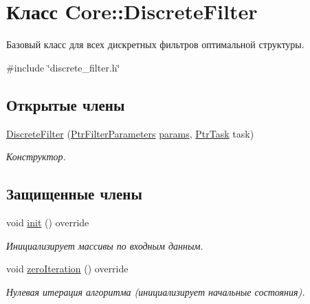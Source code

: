 \hypertarget{class_core_1_1_discrete_filter}{}\section{Класс Core\+:\+:Discrete\+Filter}
\label{class_core_1_1_discrete_filter}


Базовый класс для всех дискретных фильтров оптимальной структуры.  




{\ttfamily \#include \char`\"{}discrete\+\_\+filter.\+h\char`\"{}}

\subsection*{Открытые члены}
\begin{DoxyCompactItemize}
\item 
\hypertarget{class_core_1_1_discrete_filter_a87399ba405c2dfe8037191fe907df141}{}\label{class_core_1_1_discrete_filter_a87399ba405c2dfe8037191fe907df141} 
\hyperlink{class_core_1_1_discrete_filter_a87399ba405c2dfe8037191fe907df141}{Discrete\+Filter} (\hyperlink{namespace_core_a4811af8148ba137d644b9a61a042cf03}{Ptr\+Filter\+Parameters} \hyperlink{class_core_1_1_filter_a44aa749b49ba46256975ce545531ecf7}{params}, \hyperlink{namespace_core_abfda8f69fcacfcea2696549b548ed737}{Ptr\+Task} task)
\begin{DoxyCompactList}\small\item\em Конструктор. \end{DoxyCompactList}\end{DoxyCompactItemize}
\subsection*{Защищенные члены}
\begin{DoxyCompactItemize}
\item 
\hypertarget{class_core_1_1_discrete_filter_a0329df1e944a191bed6324958587c194}{}\label{class_core_1_1_discrete_filter_a0329df1e944a191bed6324958587c194} 
void \hyperlink{class_core_1_1_discrete_filter_a0329df1e944a191bed6324958587c194}{init} () override
\begin{DoxyCompactList}\small\item\em Инициализирует массивы по входным данным. \end{DoxyCompactList}\item 
void \hyperlink{class_core_1_1_discrete_filter_a658617c64c7067bb6b98b5e9d78f982e}{zero\+Iteration} () override
\begin{DoxyCompactList}\small\item\em Нулевая итерация алгоритма (инициализирует начальные состояния). \end{DoxyCompactList}\end{DoxyCompactItemize}
